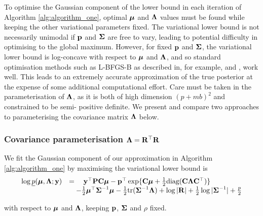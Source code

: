 To optimise the Gaussian component of the lower bound in each iteration of
Algorithm \ref{alg:algorithm_one}, optimal ${\boldsymbol \mu}$ and ${\boldsymbol \Lambda}$ values must be
found while keeping the other variational parameters fixed. The variational
lower bound is not necessarily unimodal if ${\bf p}$ and ${\boldsymbol \Sigma}$ are free to
vary, leading to potential difficulty in optimising to the global maximum.
However, for fixed ${\bf p}$ and ${\boldsymbol \Sigma}$, the variational lower bound is
log-concave with respect to ${\boldsymbol \mu}$ and ${\boldsymbol \Lambda}$, and so standard optimisation
methods such as L-BFGS-B as described in, for example, \cite{Liu1989} and
\cite{Nocedal2006}, work well. This leads to an extremely accurate
approximation of the true posterior at the expense of some additional
computational effort. Care must be taken in the parameterisation of ${\boldsymbol \Lambda}$,
as it is both of high dimension $(p + mb)^2$ and constrained to be semi-
positive definite. We present and compare two approaches to parameterising the
covariance matrix ${\boldsymbol \Lambda}$ below.
	
\subsubsection{Covariance parameterisation ${\boldsymbol \Lambda} = {\bf R}^\top {\bf R}$}

We fit the Gaussian component of our approximation in Algorithm
\ref{alg:algorithm_one} by maximising  the variational lower bound is
\begin{equation}
\label{eq:gva_lower_bound}
\begin{array}{ll}
	\log \underline{p}({\boldsymbol \mu}, {\boldsymbol \Lambda}; {\bf y}) & = \quad {\bf y}^\top{\bf P} {\bf C} {\boldsymbol\mu} - {\bf p}^\top \exp\{{\bf C} {\boldsymbol \mu} + \tfrac{1}{2} \text{diag}({\bf C} {\boldsymbol \Lambda} {\bf C}^\top)\} \\
	& \quad - \tfrac{1}{2} {\boldsymbol \mu}^\top {\boldsymbol\Sigma}^{-1} {\boldsymbol \mu} - \tfrac{1}{2} \text{tr}{({\boldsymbol\Sigma}^{-1} {\boldsymbol\Lambda})} + \log{|{\bf R}|}
	                                        + \tfrac{1}{2} \log{|{\boldsymbol\Sigma}^{-1}|}  + \tfrac{p}{2}
\end{array}
\end{equation}

\noindent with respect to ${\boldsymbol \mu}$ and ${\boldsymbol \Lambda}$, keeping ${\bf p}$, ${\boldsymbol \Sigma}$ and
$\rho$ fixed.
		
